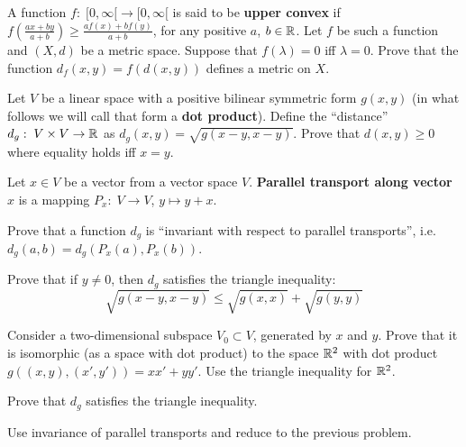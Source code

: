 \documentclass[12pt]{article}
\begin{document}
\begin{zadacha}[*] A function $f:\; [0, \infty[ \to [0, \infty[$ is
  said to be {\bf upper convex} if $f(\frac{ax+by}{a+b}) \geq \frac{
    af(x) + bf(y)}{a+b}$, for any positive $a$, $b\in {\mathbb R}$.  Let $f$ be
  such a function and $(X, d)$ be a metric space.  Suppose that
  $f(\lambda)=0$ iff $\lambda = 0$. Prove that the function $d_f(x,y)
  = f(d(x,y))$ defines a metric on $X$.
\end{zadacha}

\begin{zadacha} Let $V$ be a linear space with a positive bilinear
  symmetric form $g(x,y)$ (in what follows we will call that form a
  {\bf dot product}). Define the ``distance'' $d_g:\; V\times V \to
  {\mathbb R}$ as $d_g(x, y) = \sqrt{g(x-y, x-y)}$. Prove that $d(x,y)\geq 0$
  where equality holds iff $x=y$.
\end{zadacha}

\begin{opredelenie} Let $x\in V$ be a vector from a vector space $V$.
{\bf Parallel transport along vector $x$} is a mapping  $P_x:\;
V \to V$, $y\mapsto y+x$.
\end{opredelenie}

\begin{zadacha} Prove that a function $d_g$ is ``invariant with
  respect to parallel transports'', i.e.  $d_g(a, b) = d_g
(P_x(a), P_x(b))$.
\end{zadacha}

\begin{zadacha} Prove that if $y \neq 0$, then  $d_g$ satisfies the
  triangle inequality:
$$
\sqrt{g(x-y,x-y)} \leq \sqrt{g(x,x)}+ \sqrt{g(y,y)}
$$
\end{zadacha}

\begin{ukazanie} Consider a two-dimensional subspace $V_0 \subset V$,
  generated by $x$ and $y$. Prove that it is isomorphic (as a space
  with dot product) to the space ${\mathbb R}^2$ with dot product $g((x,y),
  (x', y')) = xx' + yy'$.  Use the triangle inequality for ${\mathbb R}^2$.
\end{ukazanie}

\begin{zadacha}[!] Prove that $d_g$ satisfies the triangle
  inequality.
\end{zadacha}

\begin{ukazanie} Use invariance of parallel transports and reduce to
  the previous problem.
\end{ukazanie}
\end{document}
